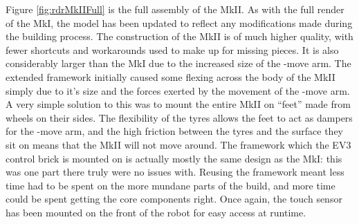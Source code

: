 \documentclass{report}
\newcommand{\move}[1]{\uppercase{\texttt{\formatmovesnospace{#1}}}-move}
\begin{document}
    Figure \ref{fig:rdrMkIIFull} is the full assembly of the MkII. As with the full render of the MkI, the model has been updated to reflect any modifications made during the building process. The construction of the MkII is of much higher quality, with fewer shortcuts and workarounds used to make up for missing pieces. It is also considerably larger than the MkI due to the increased size of the \move{x} arm. The extended framework initially caused some flexing across the body of the MkII simply due to it's size and the forces exerted by the movement of the \move{x} arm. A very simple solution to this was to mount the entire MkII on \enquote{feet} made from wheels on their sides. The flexibility of the tyres allows the feet to act as dampers for the \move{x} arm, and the high friction between the tyres and the surface they sit on means that the MkII will not move around. The framework which the EV3 control brick is mounted on is actually mostly the same design as the MkI: this was one part there truly were no issues with. Reusing the framework meant less time had to be spent on the more mundane parts of the build, and more time could be spent getting the core components right. Once again, the touch sensor has been mounted on the front of the robot for easy access at runtime.
    
\end{document}
